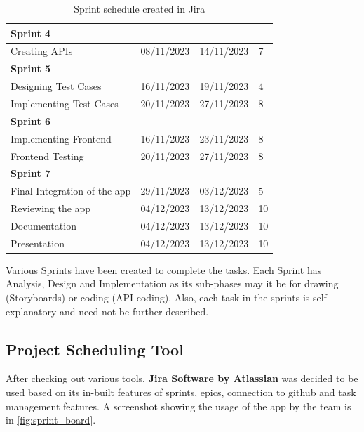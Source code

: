 \begin{table}[H]
\begin{center}
\begin{tabular}{|m{7cm}|m{3cm}|m{3cm}|m{3cm}|}
\multicolumn{4}{|l|}{\cellcolor{heading2-grey} \textbf{Sprint 4}} \\ \hline
Creating APIs & 08/11/2023 & 14/11/2023 & 7 \\ \hline

\multicolumn{4}{|l|}{\cellcolor{heading2-grey} \textbf{Sprint 5}} \\ \hline
Designing Test Cases & 16/11/2023 & 19/11/2023 & 4 \\ \hline
Implementing Test Cases & 20/11/2023 & 27/11/2023 & 8 \\ \hline

\multicolumn{4}{|l|}{\cellcolor{heading2-grey} \textbf{Sprint 6}} \\ \hline
Implementing Frontend & 16/11/2023 & 23/11/2023 & 8 \\ \hline
Frontend Testing & 20/11/2023 & 27/11/2023 & 8 \\ \hline

\multicolumn{4}{|l|}{\cellcolor{heading2-grey} \textbf{Sprint 7}} \\ \hline
Final Integration of the app & 29/11/2023 & 03/12/2023 & 5 \\ \hline
Reviewing the app & 04/12/2023 & 13/12/2023 & 10 \\ \hline
Documentation & 04/12/2023 & 13/12/2023 & 10 \\ \hline
Presentation & 04/12/2023 & 13/12/2023 & 10 \\ \hline

    \end{tabular}
\caption{Sprint schedule created in Jira}
\label{table:sprint_schedule}
\end{center}
\end{table}

Various Sprints have been created to complete the tasks. Each Sprint has Analysis, Design and Implementation as its sub-phases may it be for drawing (Storyboards) or coding (API coding). Also, each task in the sprints is self-explanatory and need not be further described.

\subsection{Project Scheduling Tool}
After checking out various tools, \textbf{Jira Software by Atlassian} was decided to be used based on its in-built features of sprints, epics, connection to github and task management features. A screenshot showing the usage of the app by the team is in \autoref{fig:sprint_board}.

